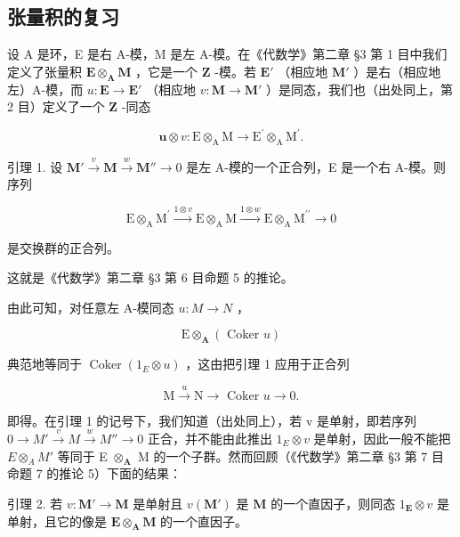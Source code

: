 \subsection{张量积的复习}

设 A 是环，E 是右 A-模，M 是左 A-模。在《代数学》第二章 §3 第 1 目中我们定义了张量积 \(\mathbf{E} \otimes_{\mathbf{A}} \mathbf{M}\) ，它是一个 \(\mathbf{Z}\) -模。若 \(\mathbf{E}'\) （相应地 \(\mathbf{M}'\) ）是右（相应地左）A-模，而 \(u: \mathbf{E} \to \mathbf{E}'\) （相应地 \(v: \mathbf{M} \to \mathbf{M}'\) ）是同态，我们也（出处同上，第 2 目）定义了一个 \(\mathbf{Z}\) -同态

\[
\boldsymbol {u} \otimes v: \mathrm{E} \otimes_ {\mathrm{A}} \mathrm{M} \rightarrow \mathrm{E} ^ {\prime} \otimes_ {\mathrm{A}} \mathrm{M} ^ {\prime}.
\]

引理 1. 设 \(\mathbf{M}' \xrightarrow{v} \mathbf{M} \xrightarrow{w} \mathbf{M}'' \to 0\) 是左 A-模的一个正合列，E 是一个右 A-模。则序列

\[
\mathrm{E} \otimes_ {\mathrm{A}} \mathrm{M} ^ {\prime} \xrightarrow {1 \otimes v} \mathrm{E} \otimes_ {\mathrm{A}} \mathrm{M} \xrightarrow {1 \otimes w} \mathrm{E} \otimes_ {\mathrm{A}} \mathrm{M} ^ {\prime \prime} \longrightarrow 0
\]

是交换群的正合列。

这就是《代数学》第二章 §3 第 6 目命题 5 的推论。

由此可知，对任意左 A-模同态 \(u: M \rightarrow N\) ，

\[
\mathrm{E} \otimes_ {\mathbf {A}} (\text { Coker } u)
\]

典范地等同于 \(\operatorname{Coker}(1_{E} \otimes u)\) ，这由把引理 1 应用于正合列

\[
\mathrm{M} \xrightarrow {u} \mathrm{N} \longrightarrow \text { Coker } u \longrightarrow 0.
\]

即得。在引理 1 的记号下，我们知道（出处同上），若 v 是单射，即若序列 \(0 \rightarrow M' \stackrel{v}{\rightarrow} M \stackrel{w}{\rightarrow} M'' \rightarrow 0\) 正合，并不能由此推出 \(1_{E} \otimes v\) 是单射，因此一般不能把 \(E \otimes_{A} M'\) 等同于 E \(\otimes_{\mathbf{A}}\) M 的一个子群。然而回顾（《代数学》第二章 §3 第 7 目命题 7 的推论 5）下面的结果：

引理 2. 若 \(v: \mathbf{M}' \to \mathbf{M}\) 是单射且 \(v(\mathbf{M}')\) 是 \(\mathbf{M}\) 的一个直因子，则同态 \(1_{\mathbf{E}} \otimes v\) 是单射，且它的像是 \(\mathbf{E} \otimes_{\mathbf{A}} \mathbf{M}\) 的一个直因子。


